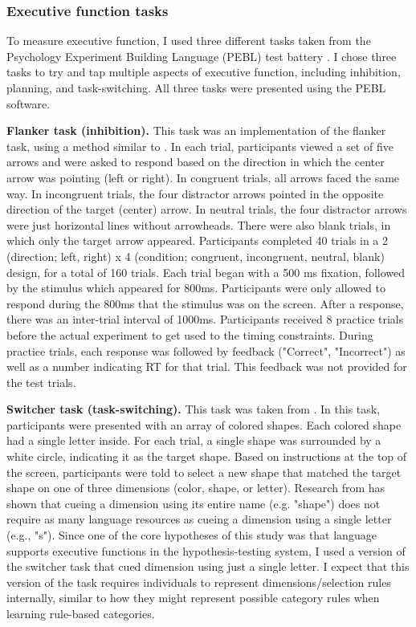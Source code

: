 \documentclass[../dissertation.tex]{subfiles}
\begin{document}
\subsubsection{Executive function tasks} 
To measure executive function, I used three different tasks taken from the Psychology Experiment Building Language (PEBL) test battery \citep{Mueller2014}. I chose three tasks to try and tap multiple aspects of executive function, including inhibition, planning, and task-switching. All three tasks were presented using the PEBL software.\par
\textbf{Flanker task (inhibition).} This task was an implementation of the \citet{Eriksen1979} flanker task, using a method similar to \citet{Stins2007}. In each trial, participants viewed a set of five arrows and were asked to respond based on the direction in which the center arrow was pointing (left or right). In congruent trials, all arrows faced the same way. In incongruent trials, the four distractor arrows pointed in the opposite direction of the target (center) arrow. In neutral trials, the four distractor arrows were just horizontal lines without arrowheads. There were also blank trials, in which only the target arrow appeared. Participants completed 40 trials in a 2 (direction; left, right) x 4 (condition; congruent, incongruent, neutral, blank) design, for a total of 160 trials. Each trial began with a 500 ms fixation, followed by the stimulus which appeared for 800ms. Participants were only allowed to respond during the 800ms that the stimulus was on the screen. After a response, there was an inter-trial interval of 1000ms. Participants received 8 practice trials before the actual experiment to get used to the timing constraints. During practice trials, each response was followed by feedback ("Correct", "Incorrect") as well as a number indicating RT for that trial. This feedback was not provided for the test trials. \par
\textbf{Switcher task (task-switching).} This task was taken from \citet{Anderson2012}. In this task, participants were presented with an array of colored shapes. Each colored shape had a single letter inside. For each trial, a single shape was surrounded by a white circle, indicating it as the target shape. Based on instructions at the top of the screen, participants were told to select a new shape that matched the target shape on one of three dimensions (color, shape, or letter). Research from \citet{Miyake2004} has shown that cueing a dimension using its entire name (e.g. "shape") does not require as many language resources as cueing a dimension using a single letter (e.g., "s"). Since one of the core hypotheses of this study was that language supports executive functions in the hypothesis-testing system, I used a version of the switcher task that cued dimension using just a single letter. I expect that this version of the task requires individuals to represent dimensions/selection rules internally, similar to how they might represent possible category rules when learning rule-based categories. \par
\end{document}
